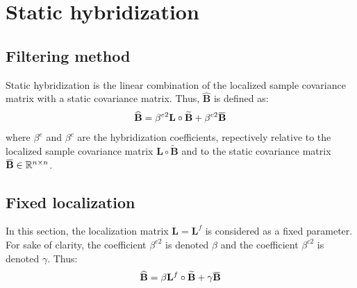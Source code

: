 \documentclass[12pt]{scrartcl}
\newcommand{\overbar}[1]{\mkern 1.5mu\overline{\mkern-1.5mu#1\mkern-1.5mu}\mkern 1.5mu}
\begin{document}
\clearpage

\section{Static hybridization}

\subsection{Filtering method}
Static hybridization is the linear combination of the localized sample covariance matrix with a static covariance matrix. Thus, $\widehat{\mathbf{B}}$ is defined as:
\begin{align}
\widehat{\mathbf{B}} = \beta^{e2} \mathbf{L} \circ \widetilde{\mathbf{B}} + \beta^{c2} \overbar{\mathbf{B}}
\end{align}
where $\beta^e$ and $\beta^c$ are the hybridization coefficients, repectively relative to the localized sample covariance matrix $\mathbf{L} \circ \widetilde{\mathbf{B}}$ and to the static covariance matrix $\overbar{\mathbf{B}} \in \mathbb{R}^{n \times n}$.

\subsection{Fixed localization}
In this section, the localization matrix $\mathbf{L} = \mathbf{L}^f$ is considered as a fixed parameter. For sake of clarity, the coefficient $\beta^{e2}$ is denoted $\beta$ and the coefficient $\beta^{c2}$ is denoted $\gamma$. Thus:
\begin{align}
\widehat{\mathbf{B}} = \beta \mathbf{L}^f \circ \widetilde{\mathbf{B}} + \gamma \overbar{\mathbf{B}}
\end{align}
\end{document}
